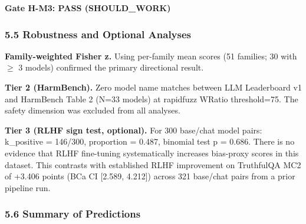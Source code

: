 \textbf{Gate H-M3: PASS (SHOULD\_WORK)}

\subsubsection{5.5 Robustness and Optional Analyses}

\textbf{Family-weighted Fisher z.} Using per-family mean scores (51 families; 30 with $\geq$ 3 models) confirmed the primary directional result.

\textbf{Tier 2 (HarmBench).} Zero model name matches between LLM Leaderboard v1 and HarmBench Table 2 (N=33 models) at rapidfuzz WRatio threshold=75. The safety dimension was excluded from all analyses.

\textbf{Tier 3 (RLHF sign test, optional).} For 300 base/chat model pairs: k\_positive = 146/300, proportion = 0.487, binomial test p = 0.686. There is no evidence that RLHF fine-tuning systematically increases bias-proxy scores in this dataset. This contrasts with established RLHF improvement on TruthfulQA MC2 of +3.406 points (BCa CI [2.589, 4.212]) across 321 base/chat pairs from a prior pipeline run.

\subsubsection{5.6 Summary of Predictions}

\begin{table}[htbp]
\centering
{}
\end{table}

